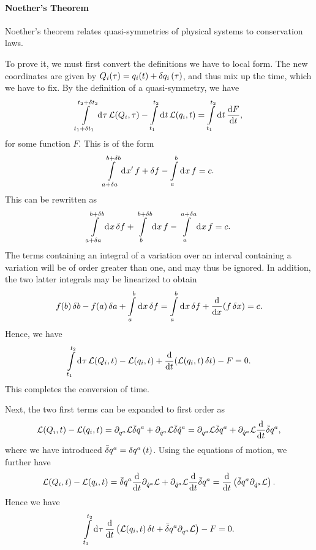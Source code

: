 \paragraph{Noether's Theorem}
Noether's theorem relates quasi-symmetries of physical systems to conservation laws.

To prove it, we must first convert the definitions we have to local form. The new coordinates are given by $Q_{i}(\tau) = q_{i}(t) + \var{q_{i}}(\tau)$, and thus mix up the time, which we have to fix. By the definition of a quasi-symmetry, we have
\begin{align*}
	\int\limits_{t_{1} + \var{t_{1}}}^{t_{2} + \var{t_{2}}}\dd[]{\tau}\mathcal{L}(Q_{i}, \tau) - \int\limits_{t_{1}}^{t_{2}}\dd[]{t}\mathcal{L}(q_{i}, t) = \int\limits_{t_{1}}^{t_{2}}\dd[]{t}\dv{F}{t},
\end{align*}
for some function $F$. This is of the form
\begin{align*}
	\int\limits_{a + \var{a}}^{b + \var{b}}\dd[]{x'}f + \var{f} - \int\limits_{a}^{b}\dd[]{x}f = c.
\end{align*}
This can be rewritten as
\begin{align*}
	\int\limits_{a + \var{a}}^{b + \var{b}}\dd[]{x}\var{f} + \int\limits_{b}^{b + \var{b}}\dd[]{x}f - \int\limits_{a}^{a + \var{a}}\dd[]{x}f = c.
\end{align*}
The terms containing an integral of a variation over an interval containing a variation will be of order greater than one, and may thus be ignored. In addition, the two latter integrals may be linearized to obtain
\begin{align*}
	f(b)\var{b} - f(a)\var{a} + \int\limits_{a}^{b}\dd[]{x}\var{f} = \int\limits_{a}^{b}\dd[]{x}\var{f} + \dv{x}(f\var{x}) = c.
\end{align*}
Hence, we have
\begin{align*}
	\int\limits_{t_{1}}^{t_{2}}\dd[]{\tau}\mathcal{L}(Q_{i}, t) - \mathcal{L}(q_{i}, t) + \dv{t}(\mathcal{L}(q_{i}, t)\var{t}) - F = 0.
\end{align*}
This completes the conversion of time.

Next, the two first terms can be expanded to first order as
\begin{align*}
	\mathcal{L}(Q_{i}, t) - \mathcal{L}(q_{i}, t) = \partial^{}_{q^{a}}\mathcal{L}\bar{\delta}q^{a} + \partial^{}_{\dot{q}^{a}}\mathcal{L}\bar{\delta}\dot{q}^{a} = \partial^{}_{q^{a}}\mathcal{L}\bar{\delta}q^{a} + \partial^{}_{\dot{q}^{a}}\mathcal{L}\dv{t}\bar{\delta}q^{a},
\end{align*}
where we have introduced $\bar{\delta}q^{a} = \var{q^{a}}(t)$. Using the equations of motion, we further have
\begin{align*}
	\mathcal{L}(Q_{i}, t) - \mathcal{L}(q_{i}, t) = \bar{\delta}q^{a}\dv{t}\partial^{}_{\dot{q}^{a}}\mathcal{L} + \partial^{}_{\dot{q}^{a}}\mathcal{L}\dv{t}\bar{\delta}q^{a} = \dv{t}\left(\bar{\delta}q^{a}\partial^{}_{\dot{q}^{a}}\mathcal{L}\right).
\end{align*}
Hence we have
\begin{align*}
	\int\limits_{t_{1}}^{t_{2}}\dd[]{\tau}\dv{t}\left(\mathcal{L}(q_{i}, t)\var{t} + \bar{\delta}q^{a}\partial^{}_{\dot{q}^{a}}\mathcal{L}\right) - F = 0.
\end{align*}

